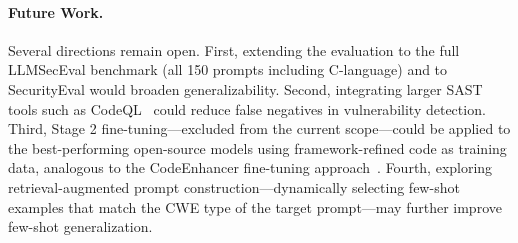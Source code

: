 \documentclass[runningheads]{llncs}
\begin{document}
\paragraph{Future Work.} Several directions remain open. First, extending the evaluation to the full LLMSecEval benchmark (all 150 prompts including C-language) and to SecurityEval would broaden generalizability. Second, integrating larger SAST tools such as CodeQL~\cite{github2023codeql} could reduce false negatives in vulnerability detection. Third, Stage 2 fine-tuning---excluded from the current scope---could be applied to the best-performing open-source models using framework-refined code as training data, analogous to the CodeEnhancer fine-tuning approach~\cite{lee2026codeenhancer}. Fourth, exploring retrieval-augmented prompt construction---dynamically selecting few-shot examples that match the CWE type of the target prompt---may further improve few-shot generalization.
\end{document}
